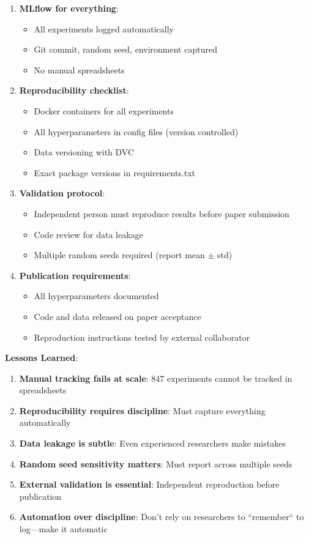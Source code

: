 \begin{enumerate}
    \item \textbf{MLflow for everything}:
    \begin{itemize}
        \item All experiments logged automatically
        \item Git commit, random seed, environment captured
        \item No manual spreadsheets
    \end{itemize}

    \item \textbf{Reproducibility checklist}:
    \begin{itemize}
        \item Docker containers for all experiments
        \item All hyperparameters in config files (version controlled)
        \item Data versioning with DVC
        \item Exact package versions in requirements.txt
    \end{itemize}

    \item \textbf{Validation protocol}:
    \begin{itemize}
        \item Independent person must reproduce results before paper submission
        \item Code review for data leakage
        \item Multiple random seeds required (report mean $\pm$ std)
    \end{itemize}

    \item \textbf{Publication requirements}:
    \begin{itemize}
        \item All hyperparameters documented
        \item Code and data released on paper acceptance
        \item Reproduction instructions tested by external collaborator
    \end{itemize}
\end{enumerate}

\textbf{Lessons Learned}:

\begin{enumerate}
    \item \textbf{Manual tracking fails at scale}: 847 experiments cannot be tracked in spreadsheets
    \item \textbf{Reproducibility requires discipline}: Must capture everything automatically
    \item \textbf{Data leakage is subtle}: Even experienced researchers make mistakes
    \item \textbf{Random seed sensitivity matters}: Must report across multiple seeds
    \item \textbf{External validation is essential}: Independent reproduction before publication
    \item \textbf{Automation over discipline}: Don't rely on researchers to ``remember`` to log---make it automatic
\end{enumerate}


